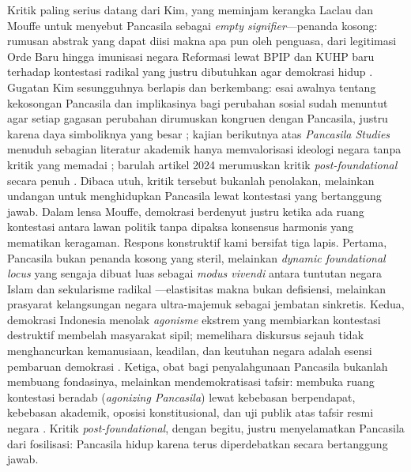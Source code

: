 \documentclass[journal]{IEEEtran}
\begin{document}
Kritik paling serius datang dari Kim, yang meminjam kerangka Laclau dan Mouffe untuk menyebut Pancasila sebagai \textit{empty signifier}---penanda kosong: rumusan abstrak yang dapat diisi makna apa pun oleh penguasa, dari legitimasi Orde Baru hingga imunisasi negara Reformasi lewat BPIP dan KUHP baru terhadap kontestasi radikal yang justru dibutuhkan agar demokrasi hidup \cite{kim2024,laclau2001,mouffe2005}. Gugatan Kim sesungguhnya berlapis dan berkembang: esai awalnya tentang kekosongan Pancasila dan implikasinya bagi perubahan sosial sudah menuntut agar setiap gagasan perubahan dirumuskan kongruen dengan Pancasila, justru karena daya simboliknya yang besar \cite{kim2021eai}; kajian berikutnya atas \textit{Pancasila Studies} menuduh sebagian literatur akademik hanya memvalorisasi ideologi negara tanpa kritik yang memadai \cite{kimssrn}; barulah artikel 2024 merumuskan kritik \textit{post-foundational} secara penuh \cite{kim2024}. Dibaca utuh, kritik tersebut bukanlah penolakan, melainkan undangan untuk menghidupkan Pancasila lewat kontestasi yang bertanggung jawab. Dalam lensa Mouffe, demokrasi berdenyut justru ketika ada ruang kontestasi antara lawan politik tanpa dipaksa konsensus harmonis yang mematikan keragaman. Respons konstruktif kami bersifat tiga lapis. Pertama, Pancasila bukan penanda kosong yang steril, melainkan \textit{dynamic foundational locus} yang sengaja dibuat luas sebagai \textit{modus vivendi} antara tuntutan negara Islam dan sekularisme radikal \cite{latif2018,madungmere2021,maarof2018}---elastisitas makna bukan defisiensi, melainkan prasyarat kelangsungan negara ultra-majemuk sebagai jembatan sinkretis. Kedua, demokrasi Indonesia menolak \textit{agonisme} ekstrem yang membiarkan kontestasi destruktif membelah masyarakat sipil; memelihara diskursus sejauh tidak menghancurkan kemanusiaan, keadilan, dan keutuhan negara adalah esensi pembaruan demokrasi \cite{madung2016,habermas1996}. Ketiga, obat bagi penyalahgunaan Pancasila bukanlah membuang fondasinya, melainkan mendemokratisasi tafsir: membuka ruang kontestasi beradab (\textit{agonizing Pancasila}) lewat kebebasan berpendapat, kebebasan akademik, oposisi konstitusional, dan uji publik atas tafsir resmi negara \cite{kim2024,suntana2023,madung2016}. Kritik \textit{post-foundational}, dengan begitu, justru menyelamatkan Pancasila dari fosilisasi: Pancasila hidup karena terus diperdebatkan secara bertanggung jawab.
\end{document}
